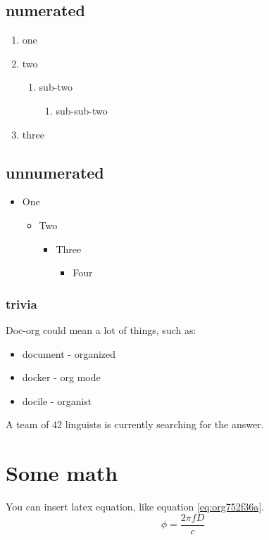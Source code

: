 \subsection{numerated}
\label{sec:org6eb61cc}
\begin{enumerate}
\item one
\item two
\begin{enumerate}
\item sub-two
\begin{enumerate}
\item sub-sub-two
\end{enumerate}
\end{enumerate}
\item three
\end{enumerate}

\subsection{unnumerated}
\label{sec:orgc0d903f}
\begin{itemize}
\item One
\begin{itemize}
\item Two
\begin{itemize}
\item Three
\begin{itemize}
\item Four
\end{itemize}
\end{itemize}
\end{itemize}
\end{itemize}

\subsubsection{trivia}
\label{sec:org97c35ae}
Doc-org could mean a lot of things, such as:
\begin{itemize}
\item document - organized
\item docker - org mode
\item docile - organist
\end{itemize}
A team of 42 linguists is currently searching for the answer.

\section{Some math}
\label{sec:orgb896bce}
You can insert latex equation, like equation \ref{eq:org752f36a}.
\begin{equation}
\label{eq:org752f36a}
\phi = \frac{2\pi fD}{c}
\end{equation}

